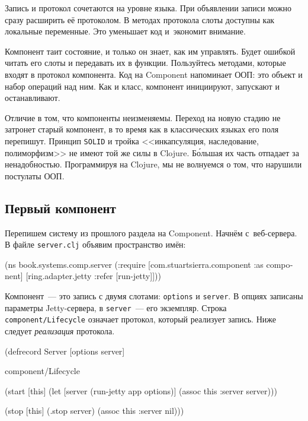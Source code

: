 Запись и протокол сочетаются на уровне языка. При объявлении записи можно сразу
расширить её протоколом. В методах протокола слоты доступны как локальные
переменные. Это уменьшает код и~экономит внимание.


Компонент таит состояние, и только он знает, как им управлять. Будет ошибкой
читать его слоты и передавать их в функции. Пользуйтесь методами, которые входят
в протокол компонента. Код на Component напоминает ООП: это объект и набор
операций над ним. Как и класс, компонент инициируют, запускают и останавливают.


Отличие в том, что компоненты неизменяемы. Переход на новую стадию не затронет
старый компонент, в то время как в классических языках его поля
перепишут. Принцип \verb|SOLID| и тройка <<инкапсуляция, наследование,
полиморфизм>> не имеют той же силы в Clojure. Б\'{о}льшая их часть отпадает за
ненадобностью. Программируя на Clojure, мы не волнуемся о том, что нарушили
постулаты ООП.

\subsection{Первый компонент}

Перепишем систему из прошлого раздела на Component. Начнём с~веб-сервера. В
файле \verb|server.clj| объявим пространство имён:

\begin{english}
  \begin{clojure}
(ns book.systems.comp.server
  (:require
   [com.stuartsierra.component :as component]
   [ring.adapter.jetty :refer [run-jetty]]))
  \end{clojure}
\end{english}

Компонент~--- это запись с двумя слотами: \verb|options| и \verb|server|. В
опциях записаны параметры Jetty-сервера, в \verb|server|~--- его
экземпляр. Строка \verb|component/Lifecycle| означает протокол, который
реализует запись. Ниже следует \emph{реализация} протокола.

\begin{english}
  \begin{clojure}
(defrecord Server [options server]

  component/Lifecycle

  (start [this]
    (let [server (run-jetty app options)]
      (assoc this :server server)))

  (stop [this]
    (.stop server)
    (assoc this :server nil)))
  \end{clojure}
\end{english}

